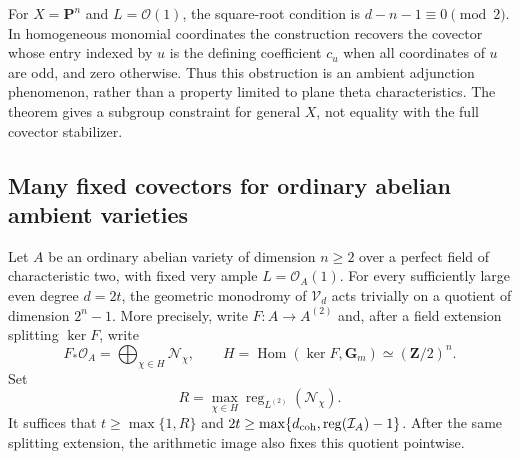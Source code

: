 \begin{remark}\label{rem:adjunction-square-Pn}
For $X=\mathbf P^n$ and $L=\mathcal O(1)$, the square-root
condition is $d-n-1\equiv0\pmod2$.  In homogeneous
monomial coordinates the construction recovers the
covector whose entry indexed by $u$ is the defining
coefficient $c_u$ when all coordinates of $u$ are odd,
and zero otherwise.  Thus this obstruction is an
ambient adjunction phenomenon, rather than a property
limited to plane theta characteristics.
The theorem gives a subgroup constraint for general
$X$, not equality with the full covector stabilizer.
\end{remark}


\subsection{Many fixed covectors for ordinary abelian ambient varieties}
\label{subsec:ordinary-abelian-covectors}

\begin{proposition}\label{prop:ordinary-abelian-fixed-quotient}
Let $A$ be an ordinary abelian variety of dimension $n\geq2$
over a perfect field of characteristic two, with fixed very
ample $L=\mathcal O_A(1)$.  For every sufficiently large even
degree $d=2t$, the geometric monodromy of $\mathcal V_d$
acts trivially on a quotient of dimension $2^n-1$.
More precisely, write $F:A\to A^{(2)}$ and, after a field
extension splitting $\ker F$, write
\[
 F_*\mathcal O_A=\bigoplus_{\chi\in H}\mathcal N_\chi,
 \qquad H=\operatorname{Hom}(\ker F,\mathbf G_m)
                 \simeq(\mathbf Z/2)^n.
\]
Set
\[
 R=\max_{\chi\in H}
         \operatorname{reg}_{L^{(2)}}(\mathcal N_\chi).
\]
It suffices that $t\geq\max\{1,R\}$ and
$2t\geq\max\{d_{\rm coh},\operatorname{reg}(\mathcal I_A)-1\}$.
After the same splitting extension, the arithmetic image
also fixes this quotient pointwise.
\end{proposition}

